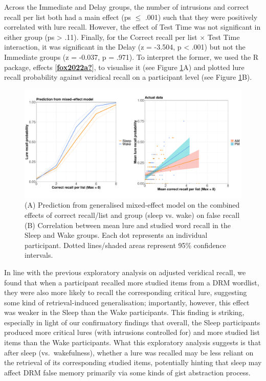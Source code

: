 \documentclass[
]{article}
\begin{document}
Across the Immediate and Delay groups, the number of intrusions and correct recall per list both had a main effect (ps \(\leq\) .001) such that they were positively correlated with lure recall. However, the effect of Test Time was not significant in either group (ps \textgreater{} .11). Finally, for the Correct recall per list \(\times\) Test Time interaction, it was significant in the Delay (z = -3.504, p \textless{} .001) but not the Immediate groups (z = -0.037, p = .971). To interpret the former, we used the R package, effects {[}\protect\hyperlink{ref-fox2022a}{\textbf{fox2022a?}}{]}, to visualise it (see Figure \ref{fig:delayfig}A) and plotted lure recall probability against veridical recall on a participant level (see Figure \ref{fig:delayfig}B).

\begin{figure}

{\centering \includegraphics{Figures/delaygraph} 

}

\caption{(A) Prediction from generalised mixed-effect model on the combined effects of correct recall/list and group (sleep vs. wake) on false recall (B) Correlation between mean lure and studied word recall in the Sleep and Wake groups. Each dot represents an individual participant. Dotted lines/shaded areas represent 95\% confidence intervals.}\label{fig:delayfig}
\end{figure}

In line with the previous exploratory analysis on adjusted veridical recall, we found that when a participant recalled more studied items from a DRM wordlist, they were also more likely to recall the corresponding critical lure, suggesting some kind of retrieval-induced generalisation; importantly, however, this effect was weaker in the Sleep than the Wake participants. This finding is striking, especially in light of our confirmatory findings that overall, the Sleep participants produced more critical lures (with intrusions controlled for) and more studied list items than the Wake participants. What this exploratory analysis suggests is that after sleep (vs.~wakefulness), whether a lure was recalled may be less reliant on the retrieval of its corresponding studied items, potentially hinting that sleep may affect DRM false memory primarily via some kinds of gist abstraction process.
\end{document}
